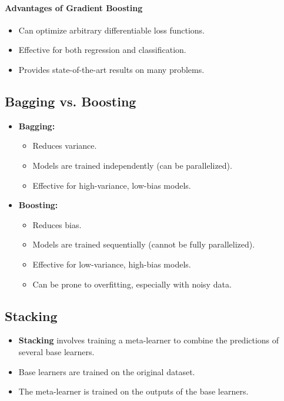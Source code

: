 \documentclass{article}
\begin{document}
\paragraph{Advantages of Gradient Boosting}

\begin{itemize}
    \item Can optimize arbitrary differentiable loss functions.
    \item Effective for both regression and classification.
    \item Provides state-of-the-art results on many problems.
\end{itemize}

\subsection{Bagging vs. Boosting}

\begin{itemize}
    \item \textbf{Bagging:}
    \begin{itemize}
        \item Reduces variance.
        \item Models are trained independently (can be parallelized).
        \item Effective for high-variance, low-bias models.
    \end{itemize}
    \item \textbf{Boosting:}
    \begin{itemize}
        \item Reduces bias.
        \item Models are trained sequentially (cannot be fully parallelized).
        \item Effective for low-variance, high-bias models.
        \item Can be prone to overfitting, especially with noisy data.
    \end{itemize}
\end{itemize}

\subsection{Stacking}

\begin{itemize}
    \item \textbf{Stacking} involves training a meta-learner to combine the predictions of several base learners.
    \item Base learners are trained on the original dataset.
    \item The meta-learner is trained on the outputs of the base learners.
\end{itemize}
\end{document}
